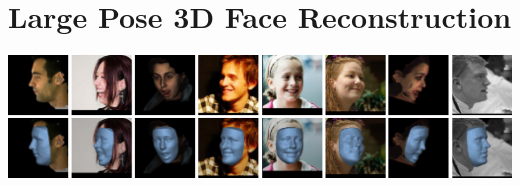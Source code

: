 \graphicspath{{chapter_faces/}}
\chapter{Large Pose 3D Face Reconstruction}


\includegraphics[width=\linewidth]{img/preview.png}


